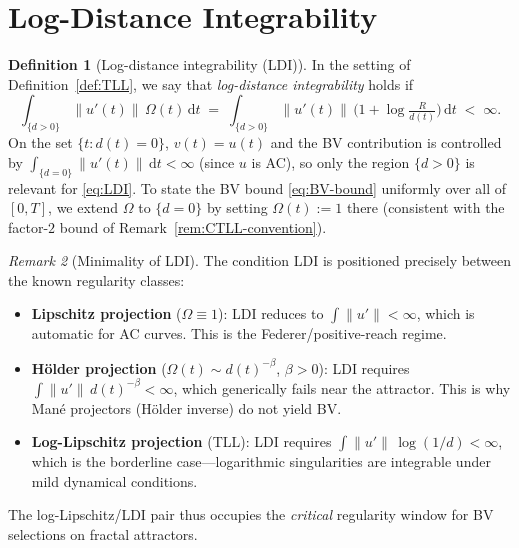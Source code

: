 \documentclass[12pt,a4paper]{article}
\theoremstyle{definition}
\newtheorem{definition}{Definition}[section]
\theoremstyle{plain}
\theoremstyle{remark}
\newtheorem{remark}[definition]{Remark}
\begin{document}
\section{Log-Distance Integrability}
\label{sec:LDI}

\begin{definition}[Log-distance integrability (LDI)]
\label{def:LDI}
In the setting of Definition~\ref{def:TLL}, we say that
\emph{log-distance integrability} holds if
\begin{equation}\label{eq:LDI}
  \int_{\{d>0\}} \|u'(t)\|\,\Omega(t)\,\mathrm{d}t
  \;=\;
  \int_{\{d>0\}} \|u'(t)\|\,
  \bigl(1 + \log\tfrac{R}{d(t)}\bigr)\,\mathrm{d}t
  \;<\; \infty.
\end{equation}
On the set $\{t : d(t) = 0\}$, $v(t) = u(t)$ and the BV
contribution is controlled by $\int_{\{d=0\}} \|u'(t)\|\,\mathrm{d}t
< \infty$ (since $u$ is AC), so only the region $\{d > 0\}$
is relevant for \eqref{eq:LDI}.  To state the BV bound
\eqref{eq:BV-bound} uniformly over all of $[0,T]$, we
extend $\Omega$ to $\{d=0\}$ by setting $\Omega(t) := 1$
there (consistent with the factor-$2$ bound of
Remark~\ref{rem:CTLL-convention}).
\end{definition}

\begin{remark}[Minimality of LDI]
\label{rem:LDI-minimal}
The condition LDI is positioned precisely between the known
regularity classes:
\begin{itemize}
  \item \textbf{Lipschitz projection} ($\Omega \equiv 1$):
    LDI reduces to $\int \|u'\| < \infty$, which is automatic
    for AC curves.  This is the Federer/positive-reach regime.
  \item \textbf{Hölder projection} ($\Omega(t) \sim d(t)^{-\beta}$,
    $\beta > 0$): LDI requires $\int \|u'\|\,d(t)^{-\beta} < \infty$,
    which generically fails near the attractor.  This is why
    Mané projectors (Hölder inverse) do not yield BV.
  \item \textbf{Log-Lipschitz projection} (TLL):
    LDI requires $\int \|u'\|\,\log(1/d) < \infty$, which is the
    borderline case---logarithmic singularities are integrable
    under mild dynamical conditions.
\end{itemize}
The log-Lipschitz/LDI pair thus occupies the \emph{critical}
regularity window for BV selections on fractal attractors.
\end{remark}
\end{document}
